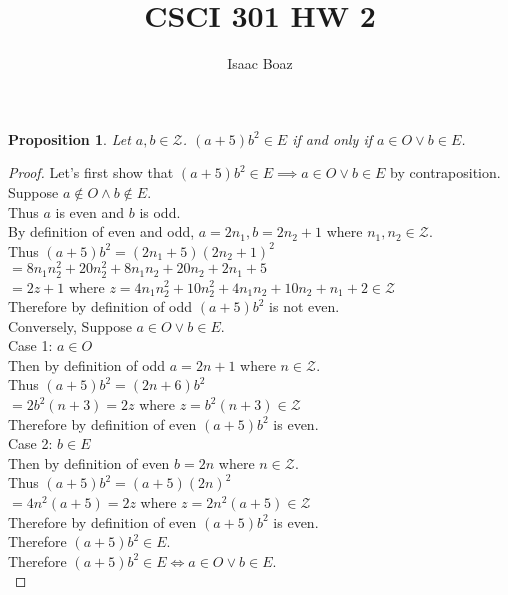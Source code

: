 \documentclass{article}
\title{\vspace{-5ex}CSCI 301 HW 2}
\author{Isaac Boaz}
\newtheorem*{theorem}{Proposition}
\begin{document}
\maketitle

\begin{theorem}
    Let \(a, b \in \mathcal{Z}\). \((a + 5)b^2 \in E\) if and only if \(a \in O \lor b \in E\).
\end{theorem}

\begin{proof}
    Let's first show that \((a + 5)b^2 \in E \implies a \in O \lor b \in E\) by contraposition. \\
    Suppose \(a \notin O \land b \notin E\). \\
    Thus \(a\) is even and \(b\) is odd. \\
    By definition of even and odd, \(a = 2n_1, b = 2n_2 + 1\) where \(n_1, n_2 \in \mathcal{Z}\). \\
    Thus \((a + 5)b^2 = (2n_1 + 5)(2n_2+1)^2\) \\
    \(= 8 n_1 n_2^2 + 20 n_2^2 + 8 n_1 n_2 + 20 n_2 + 2 n_1 + 5\) \\
    \(= 2z + 1\) where \(z = 4 n_1 n_2^2 + 10 n_2^2 + 4 n_1 n_2 + 10 n_2 + n_1 + 2 \in \mathcal{Z}\) \\
    Therefore by definition of odd \((a + 5)b^2\) is not even. \\

    \noindent
    Conversely,
    Suppose \(a \in O \lor b \in E\). \\
    Case 1: \(a \in O\) \\
    \indent
    Then by definition of odd \(a = 2n + 1\) where \(n \in \mathcal{Z}\). \\
    \indent
    Thus \((a + 5)b^2 = (2n + 6)b^2\) \\
    \indent
    \(= 2b^2(n + 3) = 2z\) where \(z = b^2(n + 3) \in \mathcal{Z}\) \\
    \indent
    Therefore by definition of even \((a + 5)b^2\) is even. \\
    Case 2: \(b \in E\) \\
    \indent
    Then by definition of even \(b = 2n\) where \(n \in \mathcal{Z}\). \\
    \indent
    Thus \((a + 5)b^2 = (a + 5)(2n)^2\) \\
    \indent
    \(= 4n^2(a+5) = 2z\) where \(z = 2n^2(a+5) \in \mathcal{Z}\) \\
    \indent
    Therefore by definition of even \((a + 5)b^2\) is even. \\
    Therefore \((a + 5)b^2 \in E\). \\

    \noindent
    Therefore \((a + 5)b^2 \in E \iff a \in O \lor b \in E\). \\
\end{proof}
\end{document}
